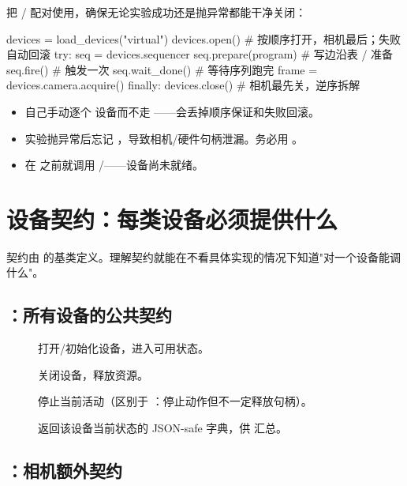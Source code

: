 \documentclass[11pt,oneside,openany]{book}
\begin{document}
把 / 配对使用，确保无论实验成功还是抛异常都能干净关闭：

\begin{codeblock}[Python]
devices = load_devices("virtual")
devices.open()                 # 按顺序打开，相机最后；失败自动回滚
try:
    seq = devices.sequencer
    seq.prepare(program)       # 写边沿表 / 准备
    seq.fire()                 # 触发一次
    seq.wait_done()            # 等待序列跑完
    frame = devices.camera.acquire()
finally:
    devices.close()            # 相机最先关，逆序拆解
\end{codeblock}

\begin{notebox}[常见错误]
\begin{itemize}
\item 自己手动逐个  设备而不走 ——会丢掉顺序保证和失败回滚。
\item 实验抛异常后忘记 ，导致相机/硬件句柄泄漏。务必用 。
\item 在  之前就调用 /——设备尚未就绪。
\end{itemize}
\end{notebox}

\section{设备契约：每类设备必须提供什么}

契约由  的基类定义。理解契约就能在不看具体实现的情况下知道"对一个设备能调什么"。

\subsection{：所有设备的公共契约}

\begin{description}
\item[] 打开/初始化设备，进入可用状态。
\item[] 关闭设备，释放资源。
\item[] 停止当前活动（区别于 ：停止动作但不一定释放句柄）。
\item[] 返回该设备当前状态的 JSON-safe 字典，供  汇总。
\end{description}

\subsection{：相机额外契约}
\end{document}
